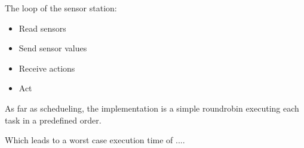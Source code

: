 The loop of the sensor station:
\begin{itemize}
  \item Read sensors
  \item Send sensor values
  \item Receive actions
  \item Act
\end{itemize}

As far as schedueling, the implementation is a simple roundrobin executing each task in a predefined order.

Which leads to a worst case execution time of ....
